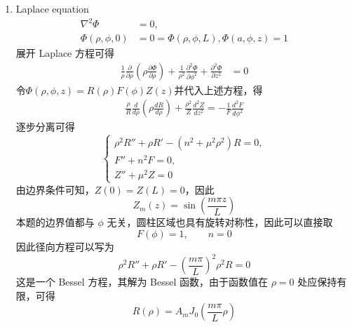 \documentclass[a4paper]{article}
\begin{document}
\begin{enumerate}
\begin{equation*}
            \Phi(\rho,\phi)=\frac{\sin\phi}{\rho}
        \end{equation*}
    \item[(b)] Laplace equation
        \begin{align*}
            \nabla^2 \Phi &= 0, \\
            \Phi(\rho, \phi, 0) &= 0 = \Phi(\rho, \phi, L), \Phi(a, \phi, z) = 1
        \end{align*}
        展开 Laplace 方程可得
        \begin{align*}
            \frac{1}{\rho} \frac{\partial}{\partial \rho} \left(\rho \frac{\partial \Phi}{\partial \rho}\right) + \frac{1}{\rho^2} \frac{\partial^2 \Phi}{\partial \phi^2} + \frac{\partial^2 \Phi}{\partial z^2}&= 0
        \end{align*}
        令$\Phi(\rho, \phi, z) = R(\rho) F(\phi) Z(z)$并代入上述方程，得
        \begin{align*}
            \frac{\rho}{R} \frac{d}{d\rho} \left( \rho \frac{dR}{d\rho} \right) + \frac{\rho^2}{Z} \frac{d^2 Z}{dz^2}= -\frac{1}{F} \frac{d^2 F}{d\phi^2}
        \end{align*}
        逐步分离可得
        \begin{equation*}
            \begin{cases}
                \rho^2R'' + \rho R' - (n^2 + \mu^2\rho^2) R = 0, \\
                F'' + n^2 F = 0, \\
                Z'' + \mu^2 Z = 0
            \end{cases}
        \end{equation*}
        由边界条件可知，$Z(0) = Z(L) = 0$，因此
        \begin{equation*}
            Z_m(z) = \sin\left(\frac{m\pi z}{L}\right)
        \end{equation*}
        本题的边界值都与 \(\phi\) 无关，圆柱区域也具有旋转对称性，因此可以直接取
        \begin{equation*}
            F(\phi) = 1, \qquad n = 0
        \end{equation*}
        因此径向方程可以写为
        \begin{equation*}
            \rho^2R'' + \rho R' - \left(\frac{m\pi}{L}\right)^2\rho^2 R = 0
        \end{equation*}
        这是一个 Bessel 方程，其解为 Bessel 函数，由于函数值在 $\rho =0 $ 处应保持有限，可得
        \begin{equation*}
            R(\rho) = A_m J_0\left(\frac{m\pi}{L} \rho\right)

\end{equation*}
\end{enumerate}
\end{document}
